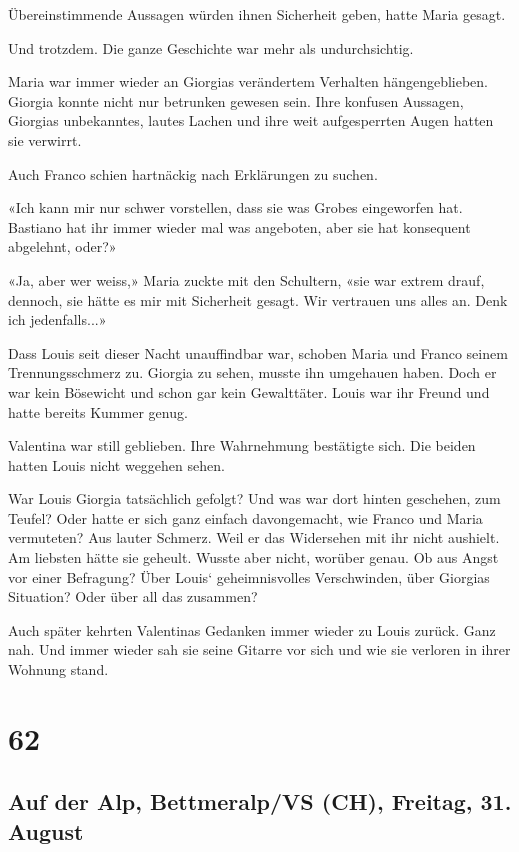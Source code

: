 Übereinstimmende Aussagen würden ihnen Sicherheit geben, hatte Maria
gesagt.

Und trotzdem. Die ganze Geschichte war mehr als undurchsichtig.

Maria war immer wieder an Giorgias verändertem Verhalten
hängengeblieben. Giorgia konnte nicht nur betrunken gewesen sein. Ihre
konfusen Aussagen, Giorgias unbekanntes, lautes Lachen und ihre weit
aufgesperrten Augen hatten sie verwirrt.

Auch Franco schien hartnäckig nach Erklärungen zu suchen.

«Ich kann mir nur schwer vorstellen, dass sie was Grobes eingeworfen
hat. Bastiano hat ihr immer wieder mal was angeboten, aber sie hat
konsequent abgelehnt, oder?»

«Ja, aber wer weiss,» Maria zuckte mit den Schultern, «sie war extrem
drauf, dennoch, sie hätte es mir mit Sicherheit gesagt. Wir vertrauen
uns alles an. Denk ich jedenfalls...»

Dass Louis seit dieser Nacht unauffindbar war, schoben Maria und Franco
seinem Trennungsschmerz zu. Giorgia zu sehen, musste ihn umgehauen
haben. Doch er war kein Bösewicht und schon gar kein Gewalttäter. Louis
war ihr Freund und hatte bereits Kummer genug.

Valentina war still geblieben. Ihre Wahrnehmung bestätigte sich. Die
beiden hatten Louis nicht weggehen sehen.

War Louis Giorgia tatsächlich gefolgt? Und was war dort hinten
geschehen, zum Teufel? Oder hatte er sich ganz einfach davongemacht, wie
Franco und Maria vermuteten? Aus lauter Schmerz. Weil er das Widersehen
mit ihr nicht aushielt. Am liebsten hätte sie geheult. Wusste aber
nicht, worüber genau. Ob aus Angst vor einer Befragung? Über Louis`
geheimnisvolles Verschwinden, über Giorgias Situation? Oder über all das
zusammen?

Auch später kehrten Valentinas Gedanken immer wieder zu Louis zurück.
Ganz nah. Und immer wieder sah sie seine Gitarre vor sich und wie sie
verloren in ihrer Wohnung stand.

\chapter{62}\label{section-62}

\section{Auf der Alp, Bettmeralp/VS (CH), Freitag, 31.
August}\label{auf-der-alp-bettmeralpvs-ch-freitag-31.-august}

